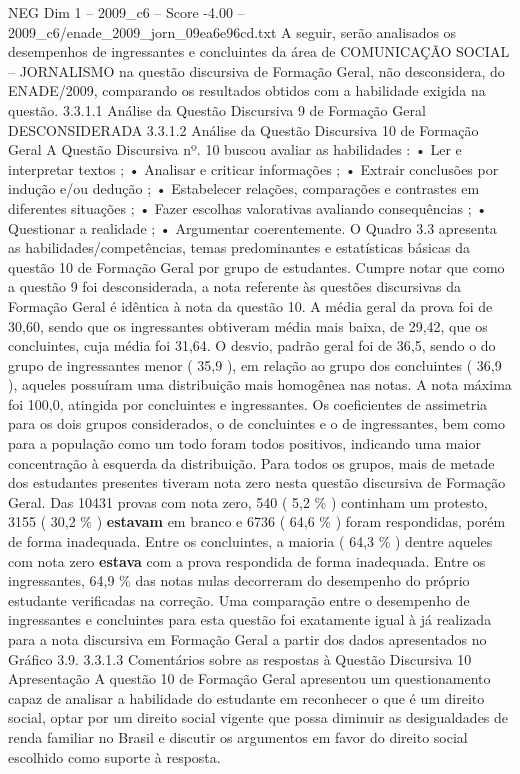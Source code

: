 \begin{textsample}{NEG Dim 1 – 2009\_c6 – Score -4.00 – 2009\_c6/enade\_2009\_jorn\_09ea6e96cd.txt}
A seguir, serão analisados os desempenhos de ingressantes e concluintes da área de COMUNICAÇÃO SOCIAL – JORNALISMO na questão discursiva de Formação Geral, não desconsidera, do ENADE/2009, comparando os resultados obtidos com a habilidade exigida na questão. 3.3.1.1 Análise da Questão Discursiva 9 de Formação Geral DESCONSIDERADA 3.3.1.2 Análise da Questão Discursiva 10 de Formação Geral A Questão Discursiva nº. 10 buscou avaliar as habilidades : • Ler e interpretar textos ; • Analisar e criticar informações ; • Extrair conclusões por indução e/ou dedução ; • Estabelecer relações, comparações e contrastes em diferentes situações ; • Fazer escolhas valorativas avaliando consequências ; • Questionar a realidade ; • Argumentar coerentemente.
O Quadro 3.3 apresenta as habilidades/competências, temas predominantes e estatísticas básicas da questão 10 de Formação Geral por grupo de estudantes.
Cumpre notar que como a questão 9 foi desconsiderada, a nota referente às questões discursivas da Formação Geral é idêntica à nota da questão 10.
A média geral da prova foi de 30,60, sendo que os ingressantes obtiveram média mais baixa, de 29,42, que os concluintes, cuja média foi 31,64.
O desvio, padrão geral foi de 36,5, sendo o do grupo de ingressantes menor ( 35,9 ), em relação ao grupo dos concluintes ( 36,9 ), aqueles possuíram uma distribuição mais homogênea nas notas.
A nota máxima foi 100,0, atingida por concluintes e ingressantes.
Os coeficientes de assimetria para os dois grupos considerados, o de concluintes e o de ingressantes, bem como para a população como um todo foram todos positivos, indicando uma maior concentração à esquerda da distribuição.
Para todos os grupos, mais de metade dos estudantes presentes tiveram nota zero nesta questão discursiva de Formação Geral.
Das 10431 provas com nota zero, 540 ( 5,2 \% ) continham um protesto, 3155 ( 30,2 \% ) \textbf{estavam} em branco e 6736 ( 64,6 \% ) foram respondidas, porém de forma inadequada.
Entre os concluintes, a maioria ( 64,3 \% ) dentre aqueles com nota zero \textbf{estava} com a prova respondida de forma inadequada.
Entre os ingressantes, 64,9 \% das notas nulas decorreram do desempenho do próprio estudante verificadas na correção.
Uma comparação entre o desempenho de ingressantes e concluintes para esta questão foi exatamente igual à já realizada para a nota discursiva em Formação Geral a partir dos dados apresentados no Gráfico 3.9. 3.3.1.3 Comentários sobre as respostas à Questão Discursiva 10 Apresentação A questão 10 de Formação Geral apresentou um questionamento capaz de analisar a habilidade do estudante em reconhecer o que é um direito social, optar por um direito social vigente que possa diminuir as desigualdades de renda familiar no Brasil e discutir os argumentos em favor do direito social escolhido como suporte à resposta.

\end{textsample}
